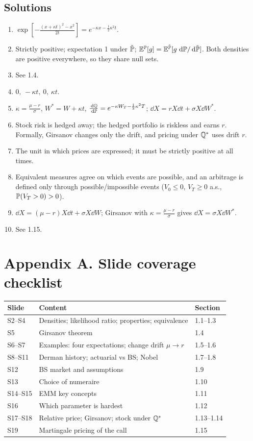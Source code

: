 \documentclass[10pt]{article}
\begin{document}
\subsection*{Solutions}
\begin{enumerate}[label=S\arabic*.]
\item $\exp[-\frac{(x+\kappa t)^2-x^2}{2t}]=e^{-\kappa x-\frac12\kappa^2t}$.
\item Strictly positive; expectation 1 under $\tilde{\mathbb{P}}$; $\mathbb{E}^{\mathbb{P}}[g]=\mathbb{E}^{\tilde{\mathbb{P}}}[g\,\,\mathrm{d}\mathbb{P}/\,\mathrm{d}\tilde{\mathbb{P}}]$. Both densities are positive everywhere, so they share null sets.
\item See 1.4.
\item $0,\ -\kappa t,\ 0,\ \kappa t$.
\item $\kappa=\frac{\mu-r}{\sigma}$, $W^*=W+\kappa t$, $\frac{\,\mathrm{d}\mathbb{Q}}{\,\mathrm{d}\mathbb{P}}=e^{-\kappa W_T-\frac12\kappa^2T}$; $\dd X=rX\dd t+\sigma X\dd W^*$.
\item Stock risk is hedged away; the hedged portfolio is riskless and earns $r$. Formally, Girsanov changes only the drift, and pricing under $\mathbb{Q}^*$ uses drift $r$.
\item The unit in which prices are expressed; it must be strictly positive at all times.
\item Equivalent measures agree on which events are possible, and an arbitrage is defined only through possible/impossible events ($V_0\le0$, $V_T\ge0$ a.s., $\mathbb{P}(V_T>0)>0$).
\item $\dd X=(\mu-r)X\dd t+\sigma X\dd W$; Girsanov with $\kappa=\frac{\mu-r}{\sigma}$ gives $\dd X=\sigma X\dd W^*$.
\item See 1.15.
\end{enumerate}

\section*{Appendix A. Slide coverage checklist}
{\small\begin{tabularx}{\linewidth}{@{}l X l@{}}\toprule
Slide & Content & Section\\\midrule
S2--S4 & Densities; likelihood ratio; properties; equivalence & 1.1--1.3\\
S5 & Girsanov theorem & 1.4\\
S6--S7 & Examples: four expectations; change drift $\mu\to r$ & 1.5--1.6\\
S8--S11 & Derman history; actuarial vs BS; Nobel & 1.7--1.8\\
S12 & BS market and assumptions & 1.9\\
S13 & Choice of numeraire & 1.10\\
S14--S15 & EMM key concepts & 1.11\\
S16 & Which parameter is hardest & 1.12\\
S17--S18 & Relative price; Girsanov; stock under $\mathbb{Q}^*$ & 1.13--1.14\\
S19 & Martingale pricing of the call & 1.15\\\bottomrule
\end{tabularx}}
\end{document}
